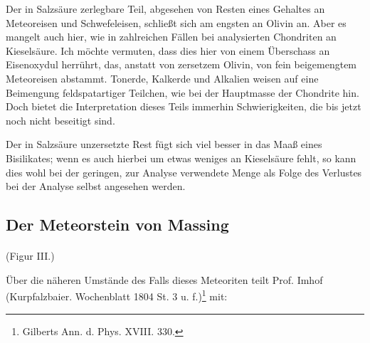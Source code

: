 \documentclass[a4paper, 11pt, oneside]{article}
\begin{document}
Der in Salzsäure zerlegbare Teil, abgesehen von Resten eines Gehaltes an Meteoreisen und Schwefeleisen, schließt sich am engsten an Olivin an. Aber es mangelt auch hier, wie in zahlreichen Fällen bei analysierten Chondriten an Kieselsäure. Ich möchte vermuten, dass dies hier von einem Überschass an Eisenoxydul herrührt, das, anstatt von zersetzem Olivin, von fein beigemengtem Meteoreisen abstammt. Tonerde, Kalkerde und Alkalien weisen auf eine Beimengung feldspatartiger Teilchen, wie bei der Hauptmasse der Chondrite hin. Doch bietet die Interpretation dieses Teils immerhin Schwierigkeiten, die bis jetzt noch nicht beseitigt sind.

Der in Salzsäure unzersetzte Rest fügt sich viel besser in das Maaß eines Bisilikates; wenn es auch hierbei um etwas weniges an Kieselsäure fehlt, so kann dies wohl bei der geringen, zur Analyse verwendete Menge als Folge des Verlustes bei der Analyse selbst angesehen werden.
\clearpage
\subsection{Der Meteorstein von Massing}
\paragraph{}
(Figur III.)

Über die näheren Umstände des Falls dieses Meteoriten teilt Prof. Imhof (Kurpfalzbaier. Wochenblatt 1804 St. 3 u. f.)\footnote{Gilberts Ann. d. Phys. XVIII. 330.} mit:
\end{document}
